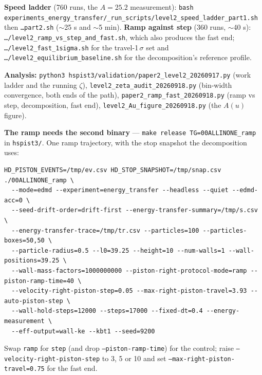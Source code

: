 \documentclass[11pt,a4paper]{article}
\newcommand{\cmd}[1]{\texttt{\footnotesize #1}}
\begin{document}
\begin{howto}
\textbf{Speed ladder} (760 runs, the $A = 25.2$ measurement):
\cmd{bash experiments\_energy\_transfer/\_run\_scripts/level2\_speed\_ladder\_part1.sh} then \cmd{\ldots part2.sh}
($\sim$25 s and $\sim$5 min).
\textbf{Ramp against step} (360 runs, $\sim$40 s): \cmd{\ldots/level2\_ramp\_vs\_step\_and\_fast.sh}, which also produces
the fast end; \cmd{\ldots/level2\_fast\_1sigma.sh} for the travel-1\,$\sigma$ set and
\cmd{\ldots/level2\_equilibrium\_baseline.sh} for the decomposition's reference profile.

\textbf{Analysis:} \cmd{python3 hspist3/validation/paper2\_level2\_20260917.py} (work ladder and the running $\zeta$),
\cmd{level2\_zeta\_audit\_20260918.py} (bin-width convergence, both ends of the path),
\cmd{paper2\_ramp\_fast\_20260918.py} (ramp vs step, decomposition, fast end),
\cmd{level2\_Au\_figure\_20260918.py} (the $A(u)$ figure).

\textbf{The ramp needs the second binary} --- \cmd{make release TG=00ALLINONE\_ramp} in \cmd{hspist3/}. One ramp
trajectory, with the stop snapshot the decomposition uses:
\begin{Verbatim}[fontsize=\scriptsize,frame=single,samepage=true]
HD_PISTON_EVENTS=/tmp/ev.csv HD_STOP_SNAPSHOT=/tmp/snap.csv ./00ALLINONE_ramp \
  --mode=edmd --experiment=energy_transfer --headless --quiet --edmd-acc=0 \
  --seed-drift-order=drift-first --energy-transfer-summary=/tmp/s.csv \
  --energy-transfer-trace=/tmp/tr.csv --particles=100 --particles-boxes=50,50 \
  --particle-radius=0.5 --l0=39.25 --height=10 --num-walls=1 --wall-positions=39.25 \
  --wall-mass-factors=1000000000 --piston-right-protocol-mode=ramp --piston-ramp-time=40 \
  --velocity-right-piston-step=0.05 --max-right-piston-travel=3.93 --auto-piston-step \
  --wall-hold-steps=12000 --steps=17000 --fixed-dt=0.4 --energy-measurement \
  --eff-output=wall-ke --kbt1 --seed=9200
\end{Verbatim}
Swap \cmd{ramp} for \cmd{step} (and drop \cmd{--piston-ramp-time}) for the control; raise
\cmd{--velocity-right-piston-step} to 3, 5 or 10 and set \cmd{--max-right-piston-travel=0.75} for the fast end.
\end{howto}
\end{document}
